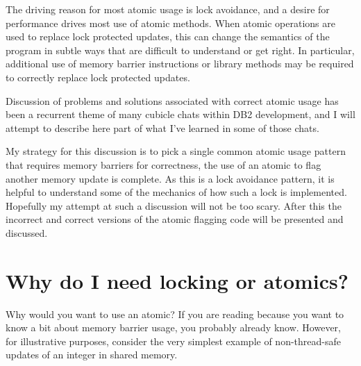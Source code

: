 The driving reason for most atomic usage is lock avoidance, and a desire for performance drives most use of atomic methods.  When atomic operations are used to replace lock protected updates, this can change the semantics of the program in subtle ways that are difficult to understand or get right.  In particular, additional use of memory barrier instructions or library methods may be required to correctly replace lock protected updates.

Discussion of problems and solutions associated with correct atomic usage has been a recurrent theme of many cubicle chats within DB2 development, and I will attempt to describe here part of what I've learned in some of those chats.

My strategy for this discussion is to pick a single common atomic usage pattern that requires memory barriers for correctness, the use of an atomic to flag another memory update is complete.  As this is a lock avoidance pattern, it is helpful to understand some of the mechanics of how such a lock is implemented.  Hopefully my attempt at such a discussion will not be too scary.  After this the incorrect and correct versions of the atomic flagging code will be presented and discussed.


\section{Why do I need locking or atomics?}

Why would you want to use an atomic?  If you are reading because you want to know a bit about memory barrier usage, you probably already know.  However, for illustrative purposes, consider the very simplest example of non-thread-safe updates of an integer in shared memory.

